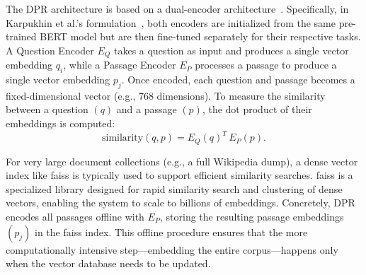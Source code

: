 The DPR architecture is based on a dual-encoder architecture~\cite{dualencoderarchitecture}. Specifically, in Karpukhin et al.'s formulation~\cite{densepassageretrievalopendomainkarpukhin2020}, both encoders are initialized from the same pre-trained BERT model but are then fine-tuned separately for their respective tasks. A Question Encoder \(E_Q\) takes a question as input and produces a single vector embedding \(q_i\), while a Passage Encoder \(E_P\) processes a passage to produce a single vector embedding \(p_j\). Once encoded, each question and passage becomes a fixed-dimensional vector (e.g., 768 dimensions). To measure the similarity between a question \((q)\) and a passage \((p)\), the dot product of their embeddings is computed:
\begin{equation}
    \label{eq:dot_sim}
    \text{similarity}(q, p) = E_Q(q)^T \, E_P(p).
\end{equation}

For very large document collections (e.g., a full Wikipedia dump), a dense vector index like \gls{faiss} \cite{douze2024faiss} is typically used to support efficient similarity searches. \gls{faiss} is a specialized library designed for rapid similarity search and clustering of dense vectors, enabling the system to scale to billions of embeddings. Concretely, DPR encodes all passages offline with \(E_P\), storing the resulting passage embeddings \((p_j)\) in the \gls{faiss} index. This offline procedure ensures that the more computationally intensive step—embedding the entire corpus—happens only when the vector database needs to be updated.



